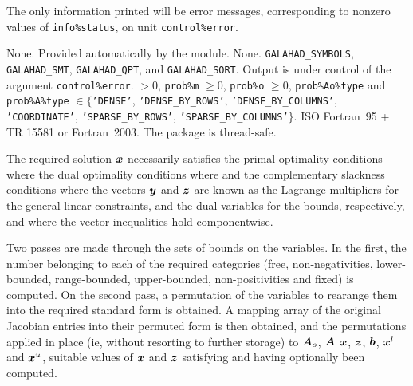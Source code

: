 \documentclass{galahad}
\begin{document}
\galinfo
The only information printed will be error messages, corresponding to 
nonzero values of {\tt info\%status}, on unit {\tt control\%error}. 


\galgeneral

\galcommon None.
\galworkspace Provided automatically by the module.
\galroutines None. 
\galmodules 
{\tt GALAHAD\_SY\-M\-BOLS}, 
{\tt GALAHAD\_SMT}, 
{\tt GALAHAD\_QPT},
and {\tt GALAHAD\_SORT}.
\galio Output is under control of the argument {\tt control\%error}.
 $> 0$, {\tt prob\%m} $\geq  0$, 
 {\tt prob\%o} $\geq  0$, 
 {\tt prob\%Ao\%type} and {\tt prob\%A\%type} $\in \{${\tt 'DENSE'}, 
 {\tt 'DENSE\_BY\_ROWS'},  {\tt 'DENSE\_BY\_COLUMNS'}, 
 {\tt 'COORDINATE'}, {\tt 'SPARSE\_BY\_ROWS'},
 {\tt 'SPARSE\_BY\_COLUMNS'}$\}$. 
\galportability ISO Fortran~95 + TR 15581 or Fortran~2003. 
The package is thread-safe.


\galmethod
The required solution ${\bm{x}}$ necessarily satisfies 
the primal optimality conditions
where
the dual optimality conditions
where
and the complementary slackness conditions 
where the vectors ${\bm{y}}$ and ${\bm{z}}$ are 
known as the Lagrange multipliers for
the general linear constraints, and the dual variables for the bounds,
respectively, and where the vector inequalities hold componentwise.

Two passes are made through the sets of bounds on the variables. 
In the first, the number belonging to each of the required categories 
(free, non-negativities, lower-bounded, range-bounded, 
upper-bounded, non-positivities and fixed) is computed. On the second pass, a 
permutation of the variables to rearange them into the required standard form 
is obtained. A mapping array of the original Jacobian entries into their 
permuted form is then obtained, and the permutations applied in place 
(ie, without resorting to further storage) to ${\bm{A}}_o$, ${\bm{A}}$ ${\bm{x}}$, ${\bm{z}}$, 
${\bm{b}}$, 
${\bm{x}}^l$ and ${\bm{x}}^u$, suitable values of ${\bm{x}}$ and ${\bm{z}}$ 
satisfying  and  having optionally been computed. 
 
\end{document}
